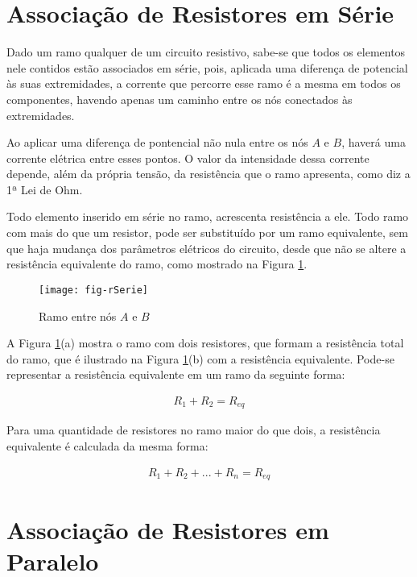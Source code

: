 \section{Associação de Resistores em Série}

Dado um ramo qualquer de um circuito resistivo, sabe-se que todos os elementos nele contidos estão associados em série, pois, aplicada uma diferença de potencial às suas extremidades, a corrente que percorre esse ramo é a mesma em todos os componentes, havendo apenas um caminho entre os nós conectados às extremidades.

Ao aplicar uma diferença de pontencial não nula entre os nós $A$ e $B$, haverá uma corrente elétrica entre esses pontos. O valor da intensidade dessa corrente depende, além da própria tensão, da resistência que o ramo apresenta, como diz a 1ª Lei de Ohm.

Todo elemento inserido em série no ramo, acrescenta resistência a ele.
Todo ramo com mais do que um resistor, pode ser substituído por um ramo equivalente, sem que haja mudança dos parâmetros elétricos do circuito, desde que não se altere a resistência equivalente do ramo, como mostrado na Figura \ref{fig:rSerie}.

\begin{figure}[!h]
	\centering
	\caption{Ramo entre nós $A$ e $B$ }
	\texttt{[image: fig-rSerie]}
	\label{fig:rSerie}
\end{figure}


A Figura \ref{fig:rSerie}(a) mostra o ramo com dois resistores, que formam a resistência total do ramo, que é ilustrado na Figura \ref{fig:rSerie}(b) com a resistência equivalente.
Pode-se representar a resistência equivalente em um ramo da seguinte forma:

\begin{eqnarray}
R_1 + R_2 = R_{eq}
\end{eqnarray}

Para uma quantidade de resistores no ramo maior do que dois, a resistência equivalente é calculada da mesma forma:

\begin{eqnarray}
R_1 + R_2 + ... + R_n = R_{eq}
\end{eqnarray}










\section{Associação de Resistores em Paralelo}

